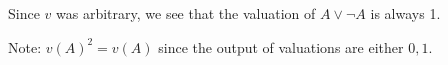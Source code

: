 \documentclass[11pt]{report}
\begin{document}
\begin{enumerate}
	Since $v$ was arbitrary, we see that the valuation of $A \lor \lnot A$ is always 1. 

	Note: $v(A)^{2} = v(A)$ since the output of valuations are either $0,1$.
	
	
	
	
\end{enumerate} 
\end{document}
